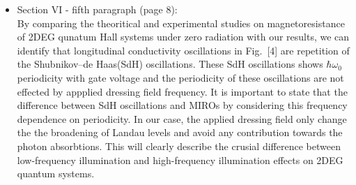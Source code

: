 \documentclass{article}
\begin{document}
\begin{itemize}
{        }
        \item Section VI - fifth paragraph (page 8):\\
        {\color{Maroon}
        By comparing the theoritical \cite{ando72,ando74_1,ando74_2,ando74_3,ando74_4,ando82,endo09} and experimental \cite{endo09,wakabayashi78} studies on magnetoresistance of 2DEG qunatum Hall systems under zero radiation with our results, we can identify that longitudinal conductivity oscillations in Fig.~[4] are repetition of the Shubnikov–de Haas(SdH) oscillations.
        These SdH oscillations shows $\hbar\omega_0$ periodicity with gate voltage and the periodicity of these oscillations are not effected by appplied dressing field frequency. It is important to state that the difference between SdH oscillations and MIROs \cite{zudov01,mani02,zudov03,mani04} by considering this frequency dependence on periodicity. In our case, the applied dressing field only change the the broadening of Landau levels and avoid any contribution towards the photon absorbtions. This will clearly describe the crusial difference between low-frequency illumination and high-frequency illumination effects on 2DEG quantum systems.
        }
    \end{itemize}
\end{document}
